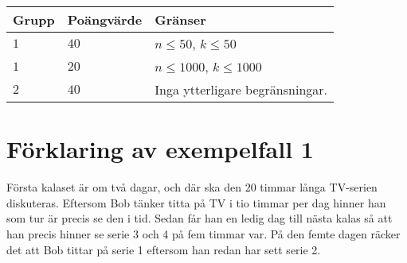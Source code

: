 \noindent
\begin{tabular}{| l | l | l |}
\hline
Grupp & Poängvärde & Gränser \\ \hline
$1$   & $40$       & $n \leq 50$, $k \leq 50$ \\ \hline
$1$   & $20$       & $n \leq 1000$, $k \leq 1000$ \\ \hline
$2$   & $40$       & Inga ytterligare begränsningar. \\ \hline
\end{tabular}

\section*{Förklaring av exempelfall 1}
Första kalaset är om två dagar, och där ska den 20 timmar långa TV-serien diskuteras. Eftersom Bob tänker titta på TV i tio timmar per dag hinner han som tur är precis se den i tid. Sedan får han en ledig dag till nästa kalas så att han precis hinner se serie 3 och 4 på fem timmar var. På den femte dagen räcker det att Bob tittar på serie 1 eftersom han redan har sett serie 2.

